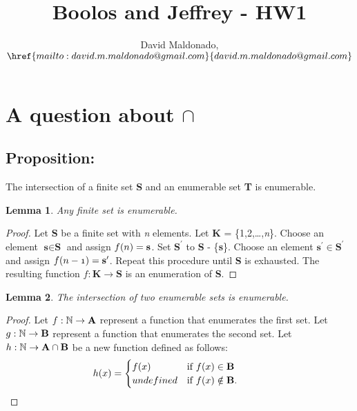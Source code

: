 \documentclass[a4paper,11pt]{article}
\author{David Maldonado, $\href{mailto:david.m.maldonado@gmail.com}%
{david.m.maldonado@gmail.com}$}
\title{Boolos and Jeffrey - HW1}
\newtheorem{lem}{Lemma}[section]
\begin{document}
\maketitle

\bigskip


\section{A question about $\cap$} 

	\subsection*{Proposition:}
	The intersection of a finite set \textbf{S} and an enumerable set \textbf{T} is enumerable.
	
	\bigskip

	\begin{lem}Any finite set is enumerable.\end{lem}
		\begin{proof}
		Let \textbf{S} be a finite set with \textit{n} elements. Let \textbf{K} = \{1,2,\dots,\textit{n}\}. 
		Choose an element $\textbf{s} \in \textbf{S}$ and assign $\mathnormal{f(n)} = \textbf{s}$. 
		Set $\textbf{S}^\prime$ to \textbf{S} - \{\textbf{s}\}. Choose an element $\textbf{s}^\prime
		\in \textbf{S}^\prime$ and assign $\mathnormal{f(n-1)} = \textbf{s}^\prime$. 
		Repeat this procedure until \textbf{S} is exhausted. The resulting function $f : \textbf{K} \rightarrow 	
		\textbf{S}$ is an enumeration of \textbf{S}.
		\end{proof}
		
		\bigskip
		
	\begin{lem}The intersection of two enumerable sets is enumerable.\end{lem}
		\begin{proof}
		Let $\mathnormal{f}: \mathbb{N} \rightarrow \textbf{A}$ represent a function that enumerates the 	first set. Let $\mathnormal{g}: \mathbb{N} \rightarrow \textbf{B}$ 
		represent a function that enumerates the second set. Let $\mathnormal{h}: \mathbb{N} \rightarrow 
		\textbf{A} \cap \textbf{B}$ be a new function defined as follows: 
		\bigskip
		\begin{equation*} \hspace*{-1cm}  h(x) = \begin{cases} f(x) &\mbox{if } f(x) \in \textbf{B} \\ 
		undefined & \mbox{if } f(x) \notin \textbf{B}. \end{cases} \end{equation*}
		\end{proof}
		
\end{document}
